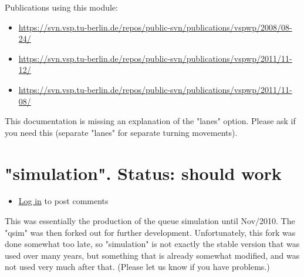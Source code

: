 \documentclass[a4paper,11pt]{report}
\begin{document}
Publications using this module:
\begin{itemize}
	\item \href{https://svn.vsp.tu-berlin.de/repos/public-svn/publications/vspwp/2008/08-24/}{https://svn.vsp.tu-berlin.de/repos/public-svn/publications/vspwp/2008/08-24/}
	\item \href{https://svn.vsp.tu-berlin.de/repos/public-svn/publications/vspwp/2011/11-12/}{https://svn.vsp.tu-berlin.de/repos/public-svn/publications/vspwp/2011/11-12/}
	\item \href{https://svn.vsp.tu-berlin.de/repos/public-svn/publications/vspwp/2011/11-08/}{https://svn.vsp.tu-berlin.de/repos/public-svn/publications/vspwp/2011/11-08/}
\end{itemize}This documentation is missing an  explanation of the "lanes" option. Please ask if you need this  (separate "lanes" for separate turning movements).




\vfill\eject
\section{"simulation". Status: should work}
\begin{itemize}
	\item \href{http://www.matsim.org/user/login?destination=comment/reply/398%23comment-form}{Log in} to post comments
\end{itemize}

This  was essentially the production of the queue simulation until Nov/2010.  The "qsim" was then forked out for further development. Unfortunately,  this fork was done somewhat too late, so "simulation" is not exactly the  stable version that was used over many years, but something that is  already somewhat modified, and was not used very much after that.  (Please let us know if you have problems.)
\end{document}
